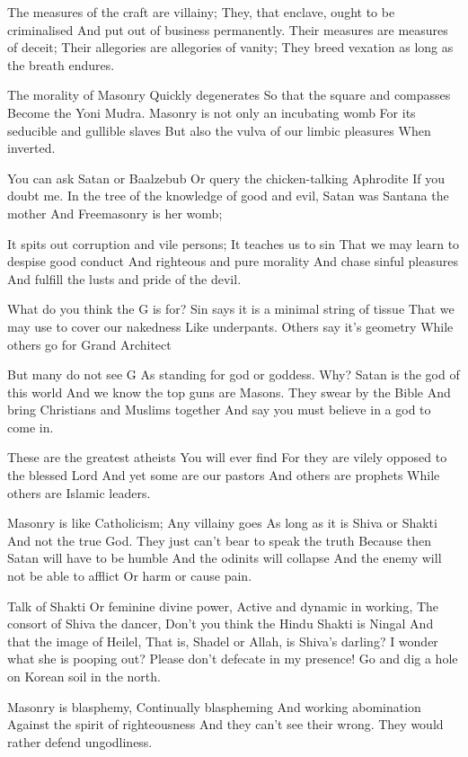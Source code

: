 \documentclass[
]{book}
\begin{document}
The measures of the craft are villainy;
They, that enclave, ought to be criminalised
And put out of business permanently.
Their measures are measures of deceit;
Their allegories are allegories of vanity;
They breed vexation as long as the breath endures.

The morality of Masonry
Quickly degenerates
So that the square and compasses
Become the Yoni Mudra.
Masonry is not only an incubating womb
For its seducible and gullible slaves
But also the vulva of our limbic pleasures
When inverted.

You can ask Satan or Baalzebub
Or query the chicken-talking Aphrodite
If you doubt me.
In the tree of the knowledge of good and evil,
Satan was Santana the mother
And Freemasonry is her womb;

It spits out corruption and vile persons;
It teaches us to sin
That we may learn to despise good conduct
And righteous and pure morality
And chase sinful pleasures
And fulfill the lusts and pride of the devil.

What do you think the G is for?
Sin says it is a minimal string of tissue
That we may use to cover our nakedness
Like underpants.
Others say it's geometry
While others go for Grand Architect

But many do not see G
As standing for god or goddess.
Why? Satan is the god of this world
And we know the top guns are Masons.
They swear by the Bible
And bring Christians and Muslims together
And say you must believe in a god to come in.

These are the greatest atheists
You will ever find
For they are vilely opposed to the blessed Lord
And yet some are our pastors
And others are prophets
While others are Islamic leaders.

Masonry is like Catholicism;
Any villainy goes
As long as it is Shiva or Shakti
And not the true God.
They just can't bear to speak the truth
Because then Satan will have to be humble
And the odinits will collapse
And the enemy will not be able to afflict
Or harm or cause pain.

Talk of Shakti
Or feminine divine power,
Active and dynamic in working,
The consort of Shiva the dancer,
Don't you think the Hindu Shakti is Ningal
And that the image of Heilel,
That is, Shadel or Allah, is Shiva's darling?
I wonder what she is pooping out?
Please don't defecate in my presence!
Go and dig a hole on Korean soil in the north.

Masonry is blasphemy,
Continually blaspheming
And working abomination
Against the spirit of righteousness
And they can't see their wrong.
They would rather defend ungodliness.
\end{document}
